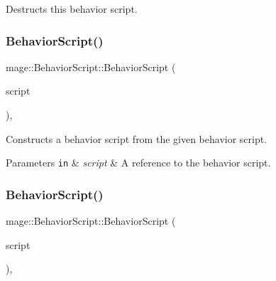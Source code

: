 Destructs this behavior script. \hypertarget{classmage_1_1_behavior_script_a776701dc960610d3a08679bc01e1def5}{}\label{classmage_1_1_behavior_script_a776701dc960610d3a08679bc01e1def5} 
\subsubsection{\texorpdfstring{Behavior\+Script()}{BehaviorScript()}\hspace{0.1cm}{\footnotesize\ttfamily [2/3]}}
{\footnotesize\ttfamily mage\+::\+Behavior\+Script\+::\+Behavior\+Script (\begin{DoxyParamCaption}\item[{const \hyperlink{classmage_1_1_behavior_script}{Behavior\+Script} \&}]{script }\end{DoxyParamCaption})\hspace{0.3cm}{\ttfamily [private]}, {\ttfamily [delete]}}

Constructs a behavior script from the given behavior script.


\begin{DoxyParams}[1]{Parameters}
\mbox{\tt in}  & {\em script} & A reference to the behavior script. \\
\hline
\end{DoxyParams}
\hypertarget{classmage_1_1_behavior_script_abec49e419345fbcdeba047d21a390416}{}\label{classmage_1_1_behavior_script_abec49e419345fbcdeba047d21a390416} 
\subsubsection{\texorpdfstring{Behavior\+Script()}{BehaviorScript()}\hspace{0.1cm}{\footnotesize\ttfamily [3/3]}}
{\footnotesize\ttfamily mage\+::\+Behavior\+Script\+::\+Behavior\+Script (\begin{DoxyParamCaption}\item[{\hyperlink{classmage_1_1_behavior_script}{Behavior\+Script} \&\&}]{script }\end{DoxyParamCaption})\hspace{0.3cm}{\ttfamily [private]}, {\ttfamily [delete]}}

